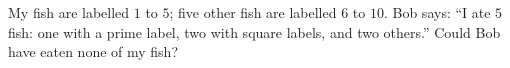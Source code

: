 My fish are labelled $1$ to $5$; five other fish are labelled $6$ to $10$. Bob says: ``I ate $5$ fish: one with a prime label, two with square labels, and two others.'' Could Bob have eaten none of my fish?

